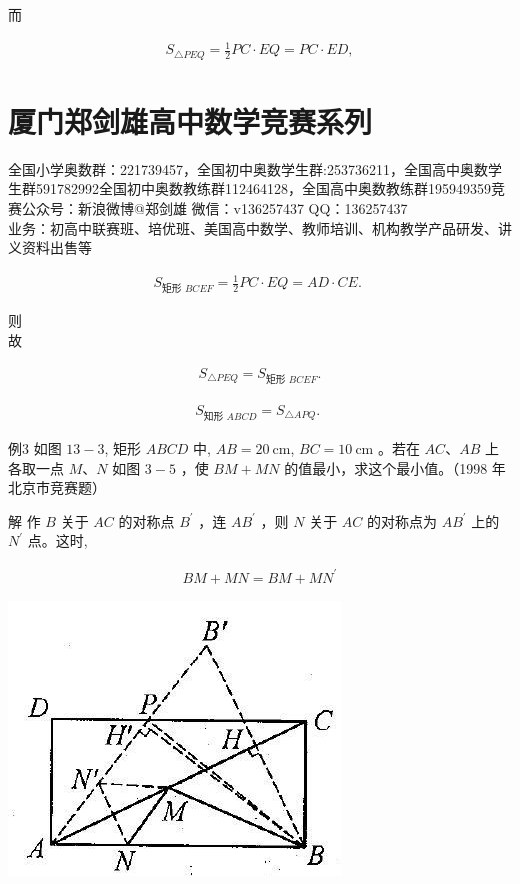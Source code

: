 \documentclass[10pt]{article}
\begin{document}
而

\begin{align*}
S_{\triangle P E Q}=\frac{1}{2} P C \cdot E Q=P C \cdot E D,
\end{align*}

\section*{厦门郑剑雄高中数学竞赛系列}
全国小学奥数群：221739457，全国初中奥数学生群:253736211，全国高中奥数学生群591782992全国初中奥数教练群112464128，全国高中奥数教练群195949359竞赛公众号：新浪微博@郑剑雄 微信：v136257437 QQ：136257437\\
业务：初高中联赛班、培优班、美国高中数学、教师培训、机构教学产品研发、讲义资料出售等

\begin{align*}
S_{\text {矩形 } B C E F}=\frac{1}{2} P C \cdot E Q=A D \cdot C E \text {. }
\end{align*}

则\\
故

\begin{align*}
S_{\triangle P E Q}=S_{\text {矩形 } B C E F} .
\end{align*}

\begin{align*}
S_{\text {知形 } A B C D}=S_{\triangle A P Q} \text {. }
\end{align*}

例3 如图 $13-3$, 矩形 $A B C D$ 中, $A B=20 \mathrm{~cm}$, $B C=10 \mathrm{~cm}$ 。若在 $A C 、 A B$ 上各取一点 $M 、 N$ 如图 $3-5$ ，使 $B M+M N$ 的值最小，求这个最小值。（1998 年北京市竞赛题）

解 作 $B$ 关于 $A C$ 的对称点 $B^{\prime}$ ，连 $A B^{\prime}$ ，则 $N$ 关于 $A C$ 的对称点为 $A B^{\prime}$ 上的 $N^{\prime}$ 点。这时,

\begin{align*}
B M+M N=B M+M N^{\prime}
\end{align*}

\begin{center}
\includegraphics[max width=\textwidth]{2024_10_30_2c8f45efd4a519b08e1ag-121(1)}
\end{center}
\end{document}
